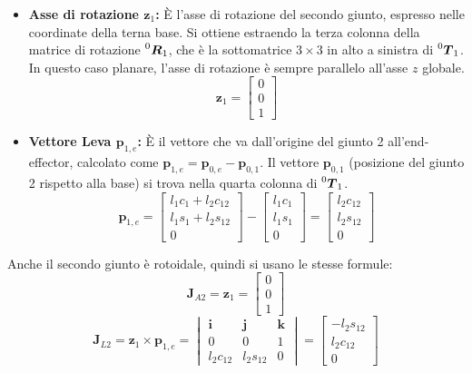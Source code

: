 ﻿\documentclass[11pt, a4paper]{article}
\begin{document}
\begin{itemize}
    \item \textbf{Asse di rotazione \(\bm{z}_1\):} È l'asse di rotazione del secondo giunto, espresso nelle coordinate della terna base. Si ottiene estraendo la terza colonna della matrice di rotazione \(\prescript{0}{}{\bm{R}}_1\), che è la sottomatrice \(3 \times 3\) in alto a sinistra di \(\prescript{0}{}{\bm{T}}_1\). In questo caso planare, l'asse di rotazione è sempre parallelo all'asse \(z\) globale.
    \[ \bm{z}_1 = \begin{bmatrix} 0 \\ 0 \\ 1 \end{bmatrix} \]
    \item \textbf{Vettore Leva \(\bm{p}_{1,e}\):} È il vettore che va dall'origine del giunto 2 all'end-effector, calcolato come \(\bm{p}_{1,e} = \bm{p}_{0,e} - \bm{p}_{0,1}\). Il vettore \(\bm{p}_{0,1}\) (posizione del giunto 2 rispetto alla base) si trova nella quarta colonna di \(\prescript{0}{}{\bm{T}}_1\).
    \[
        \bm{p}_{1,e} =
        \begin{bmatrix} l_1 c_1 + l_2 c_{12} \\ l_1 s_1 + l_2 s_{12} \\ 0 \end{bmatrix}
        -
        \begin{bmatrix} l_1 c_1 \\ l_1 s_1 \\ 0 \end{bmatrix}
        =
        \begin{bmatrix} l_2 c_{12} \\ l_2 s_{12} \\ 0 \end{bmatrix}
    \]
\end{itemize}
Anche il secondo giunto è rotoidale, quindi si usano le stesse formule:
\[
    \bm{J}_{A2} = \bm{z}_1 = \begin{bmatrix} 0 \\ 0 \\ 1 \end{bmatrix}
\]
\[
    \bm{J}_{L2} = \bm{z}_1 \times \bm{p}_{1,e} =
    \begin{vmatrix}
        \bm{i} & \bm{j} & \bm{k} \\
        0 & 0 & 1 \\
        l_2 c_{12} & l_2 s_{12} & 0
    \end{vmatrix}
    = \begin{bmatrix} -l_2 s_{12} \\ l_2 c_{12} \\ 0 \end{bmatrix}
\]
\end{document}
